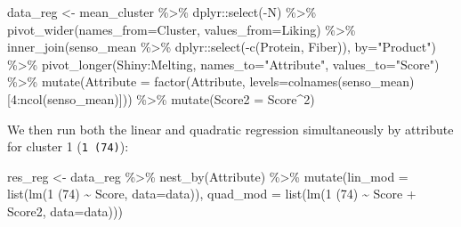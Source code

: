\documentclass[
]{book}
\newenvironment{Shaded}{\begin{snugshade}}{\end{snugshade}}
\newcommand{\AttributeTok}[1]{\textcolor[rgb]{0.77,0.63,0.00}{#1}}
\newcommand{\DecValTok}[1]{\textcolor[rgb]{0.00,0.00,0.81}{#1}}
\newcommand{\FunctionTok}[1]{\textcolor[rgb]{0.00,0.00,0.00}{#1}}
\newcommand{\NormalTok}[1]{#1}
\newcommand{\OtherTok}[1]{\textcolor[rgb]{0.56,0.35,0.01}{#1}}
\newcommand{\SpecialCharTok}[1]{\textcolor[rgb]{0.00,0.00,0.00}{#1}}
\newcommand{\StringTok}[1]{\textcolor[rgb]{0.31,0.60,0.02}{#1}}
\begin{document}
\begin{Shaded}
\begin{Highlighting}[]
\NormalTok{data\_reg }\OtherTok{\textless{}{-}}\NormalTok{ mean\_cluster }\SpecialCharTok{\%\textgreater{}\%} 
\NormalTok{  dplyr}\SpecialCharTok{::}\FunctionTok{select}\NormalTok{(}\SpecialCharTok{{-}}\NormalTok{N) }\SpecialCharTok{\%\textgreater{}\%} 
  \FunctionTok{pivot\_wider}\NormalTok{(}\AttributeTok{names\_from=}\NormalTok{Cluster, }\AttributeTok{values\_from=}\NormalTok{Liking) }\SpecialCharTok{\%\textgreater{}\%} 
  \FunctionTok{inner\_join}\NormalTok{(senso\_mean }\SpecialCharTok{\%\textgreater{}\%}\NormalTok{ dplyr}\SpecialCharTok{::}\FunctionTok{select}\NormalTok{(}\SpecialCharTok{{-}}\FunctionTok{c}\NormalTok{(Protein, Fiber)), }\AttributeTok{by=}\StringTok{"Product"}\NormalTok{) }\SpecialCharTok{\%\textgreater{}\%} 
  \FunctionTok{pivot\_longer}\NormalTok{(Shiny}\SpecialCharTok{:}\NormalTok{Melting, }\AttributeTok{names\_to=}\StringTok{"Attribute"}\NormalTok{, }\AttributeTok{values\_to=}\StringTok{"Score"}\NormalTok{) }\SpecialCharTok{\%\textgreater{}\%} 
  \FunctionTok{mutate}\NormalTok{(}\AttributeTok{Attribute =} \FunctionTok{factor}\NormalTok{(Attribute, }\AttributeTok{levels=}\FunctionTok{colnames}\NormalTok{(senso\_mean)[}\DecValTok{4}\SpecialCharTok{:}\FunctionTok{ncol}\NormalTok{(senso\_mean)])) }\SpecialCharTok{\%\textgreater{}\%} 
  \FunctionTok{mutate}\NormalTok{(}\AttributeTok{Score2 =}\NormalTok{ Score}\SpecialCharTok{\^{}}\DecValTok{2}\NormalTok{)}
\end{Highlighting}
\end{Shaded}

We then run both the linear and quadratic regression simultaneously by attribute for cluster 1 (\texttt{1\ (74)}):

\begin{Shaded}
\begin{Highlighting}[]
\NormalTok{res\_reg }\OtherTok{\textless{}{-}}\NormalTok{ data\_reg }\SpecialCharTok{\%\textgreater{}\%} 
  \FunctionTok{nest\_by}\NormalTok{(Attribute) }\SpecialCharTok{\%\textgreater{}\%} 
  \FunctionTok{mutate}\NormalTok{(}\AttributeTok{lin\_mod =} \FunctionTok{list}\NormalTok{(}\FunctionTok{lm}\NormalTok{(}\StringTok{\textasciigrave{}}\AttributeTok{1 (74)}\StringTok{\textasciigrave{}} \SpecialCharTok{\textasciitilde{}}\NormalTok{ Score, }\AttributeTok{data=}\NormalTok{data)), }\AttributeTok{quad\_mod =} \FunctionTok{list}\NormalTok{(}\FunctionTok{lm}\NormalTok{(}\StringTok{\textasciigrave{}}\AttributeTok{1 (74)}\StringTok{\textasciigrave{}} \SpecialCharTok{\textasciitilde{}}\NormalTok{ Score }\SpecialCharTok{+}\NormalTok{ Score2, }\AttributeTok{data=}\NormalTok{data)))}
\end{Highlighting}
\end{Shaded}
\end{document}
